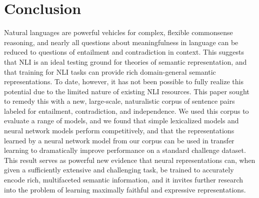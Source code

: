 \section{Conclusion}\label{sec:conclusion}

Natural languages are powerful vehicles for complex, flexible
commonsense reasoning, and nearly all questions about meaningfulness
in language can be reduced to questions of entailment
and contradiction in context. This suggests that NLI is an ideal testing ground
for theories of semantic representation, and that training for NLI
tasks can provide rich domain-general semantic representations.  To
date, however, it has not been possible to fully realize this
potential due to the limited nature of existing NLI resources.  This
paper sought to remedy this with a new, large-scale, naturalistic
corpus of sentence pairs labeled for entailment, contradiction, and
independence. We used this corpus to evaluate a range of models,
and we found that simple lexicalized models and neural network
models perform competitively, and that the representations learned by
a neural network model from our corpus can be used in transfer learning
to dramatically improve performance on a standard challenge dataset.
This result serves as powerful new evidence that neural representations can, 
when given a sufficiently extensive and challenging task, 
be trained to accurately encode rich, multifaceted semantic information, and it invites
further research into the problem of learning maximally faithful and expressive
 representations.